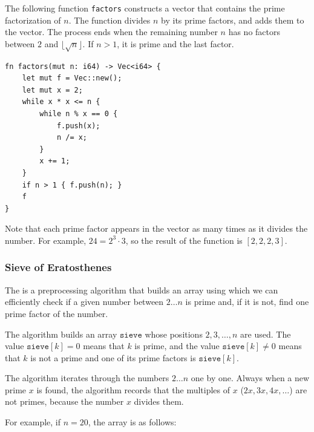 \noindent
The following function \texttt{factors}
constructs a vector that contains the prime
factorization of $n$.
The function divides $n$ by its prime factors,
and adds them to the vector.
The process ends when the remaining number $n$
has no factors between $2$ and $\lfloor \sqrt n \rfloor$.
If $n>1$, it is prime and the last factor.

\begin{lstlisting}
fn factors(mut n: i64) -> Vec<i64> {
    let mut f = Vec::new();
    let mut x = 2;
    while x * x <= n {
        while n % x == 0 {
            f.push(x);
            n /= x;
        }
        x += 1;
    }
    if n > 1 { f.push(n); }
    f
}
\end{lstlisting}

Note that each prime factor appears in the vector
as many times as it divides the number.
For example, $24=2^3 \cdot 3$,
so the result of the function is $[2,2,2,3]$.

\subsubsection{Sieve of Eratosthenes}


The 
is a preprocessing
algorithm that builds an array using which we
can efficiently check if a given number between $2 \ldots n$
is prime and, if it is not, find one prime factor of the number.

The algorithm builds an array $\texttt{sieve}$
whose positions $2,3,\ldots,n$ are used.
The value $\texttt{sieve}[k]=0$ means
that $k$ is prime,
and the value $\texttt{sieve}[k] \neq 0$
means that $k$ is not a prime and one
of its prime factors is $\texttt{sieve}[k]$.

The algorithm iterates through the numbers
$2 \ldots n$ one by one.
Always when a new prime $x$ is found,
the algorithm records that the multiples
of $x$ ($2x,3x,4x,\ldots$) are not primes,
because the number $x$ divides them.

For example, if $n=20$, the array is as follows:

